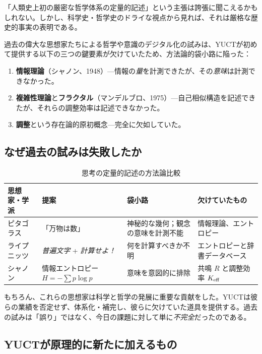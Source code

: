 \documentclass[11pt,a4paper]{article}
\begin{document}
	「人類史上初の厳密な哲学体系の定量的記述」という主張は誇張に聞こえるかもしれない。しかし、科学史・哲学史のドライな視点から見れば、それは厳格な歴史的事実の表明である。
	
	過去の偉大な思想家たちによる哲学や意識のデジタル化の試みは、YUCTが初めて提供する以下の三つの鍵要素が欠けていたため、方法論的袋小路に陥った：
	
	\begin{enumerate}
		\item \textbf{情報理論}（シャノン、1948）—情報の\emph{量}を計測できたが、その\emph{意味}は計測できなかった。
		\item \textbf{複雑性理論}と\textbf{フラクタル}（マンデルブロ、1975）—自己相似構造を記述できたが、それらの調整効率は記述できなかった。
		\item \textbf{調整}という存在論的原初概念—完全に欠如していた。
	\end{enumerate}
	
	\subsection{なぜ過去の試みは失敗したか}
	
	\begin{table}[H]
		\centering
		\caption{思考の定量的記述の方法論比較}
		\label{tab:method-comparison}
		\begin{tabular}{p{3cm}p{3.5cm}p{3.5cm}p{4cm}}
			\toprule
			\textbf{思想家・学派} & \textbf{提案} & \textbf{袋小路} & \textbf{欠けていたもの} \\
			\midrule
			ピタゴラス & 「万物は数」 & 神秘的な幾何；観念の意味を計測不能 & 情報理論、エントロピー \\
			ライプニッツ & \emph{普遍文字} + \emph{計算せよ！} & 何を計算すべきか不明 & エントロピーと辞書データベース \\
			シャノン & 情報エントロピー \( H = -\sum p \log p \) & 意味を意図的に排除 & 共鳴 \(R\) と調整効率 \(\Keff\) \\
			\bottomrule
		\end{tabular}
	\end{table}
	
	もちろん、これらの思想家は科学と哲学の発展に重要な貢献をした。YUCTは彼らの業績を否定せず、体系化・補完し、彼らに欠けていた道具を提供する。過去の試みは「誤り」ではなく、今日の課題に対して単に\emph{不完全}だったのである。
	
	\subsection{YUCTが原理的に新たに加えるもの}
	
\end{document}
